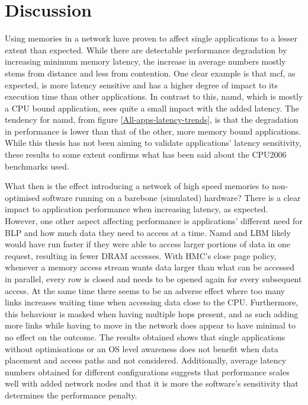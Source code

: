 \chapter{Discussion}
Using memories in a network have proven to affect single applications to a lesser extent than expected. While there are detectable performance degradation by increasing minimum memory latency, the increase in average numbers mostly stems from distance and less from contention. One clear example is that mcf, as expected, is more latency sensitive and has a higher degree of impact to its execution time than other applications. In contrast to this, namd, which is mostly a CPU bound application, sees quite a small impact with the added latency. The tendency for namd, from figure \ref{All-apps-latency-trends}, is that the degradation in performance is lower than that of the other, more memory bound applications. While this thesis has not been aiming to validate applications' latency sensitivity, these results to some extent confirms what has been said about the CPU2006 benchmarks used.
\bigskip

What then is the effect introducing a network of high speed memories to non-optimised software running on a barebone (simulated) hardware? There is a clear impact to application performance when increasing latency, as expected. However, one other aspect affecting performance is applications' different need for BLP and how much data they need to access at a time. Namd and LBM likely would have run faster if they were able to access larger portions of data in one request, resulting in fewer DRAM accesses. With HMC's close page policy, whenever a memory access stream wants data larger than what can be accessed in parallel, every row is closed and needs to be opened again for every subsequent access. At the same time there seems to be an adverse effect where too many links increases waiting time when accessing data close to the CPU. Furthermore, this behaviour is masked when having multiple hops present, and as such adding more links while having to move in the network does appear to have minimal to no effect on the outcome. The results obtained shows that single applications without optimisations or an OS level awareness does not benefit when data placement and access paths and not considered. Additionally, average latency numbers obtained for different configurations suggests that performance scales well with added network nodes and that it is more the software's sensitivity that determines the performance penalty. 
\bigskip

